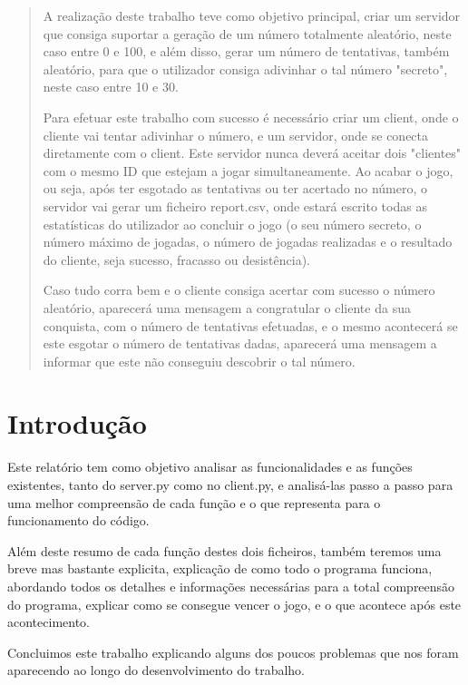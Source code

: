 \documentclass{report}
\begin{document}
\begin{abstract}
\par A realização deste trabalho teve como objetivo principal, criar um servidor que consiga suportar a geração de um número totalmente aleatório, neste caso entre 0 e 100, e além disso, gerar um número de tentativas, também aleatório, para que o utilizador consiga adivinhar o tal número "secreto", neste caso entre 10 e 30. \par
Para efetuar este trabalho com sucesso é necessário criar um client, onde o cliente vai tentar adivinhar o número, e um servidor, onde se conecta diretamente com o client. Este servidor nunca deverá aceitar dois "clientes" com o mesmo ID que estejam a jogar simultaneamente. Ao acabar o jogo, ou seja, após ter esgotado as tentativas ou ter acertado no número, o servidor vai gerar um ficheiro report.csv, onde estará escrito todas as estatísticas do utilizador ao concluir o jogo (o seu número secreto, o número máximo de jogadas, o número de jogadas realizadas e o resultado do cliente, seja sucesso, fracasso ou desistência).\par
Caso tudo corra bem e o cliente consiga acertar com sucesso o número aleatório, aparecerá uma mensagem a congratular o cliente da sua conquista, com o número de tentativas efetuadas, e o mesmo acontecerá se este esgotar o número de tentativas dadas, aparecerá uma mensagem a informar que este não conseguiu descobrir o tal número.
\end{abstract}



\tableofcontents


\clearpage
{}

\chapter{Introdução}
\label{chap.introducao}
\par Este relatório tem como objetivo analisar as funcionalidades e as funções existentes, tanto do server.py como no client.py, e analisá-las passo a passo para uma melhor compreensão de cada função e o que representa para o funcionamento do código.\par Além deste resumo de cada função destes dois ficheiros, também teremos uma breve mas bastante explicita, explicação de como todo o programa funciona, abordando todos os detalhes e informações necessárias para a total compreensão do programa, explicar como se consegue vencer o jogo, e o que acontece após este acontecimento.\par Concluimos este trabalho explicando alguns dos poucos problemas que nos foram aparecendo ao longo do desenvolvimento do trabalho. 
\end{document}
